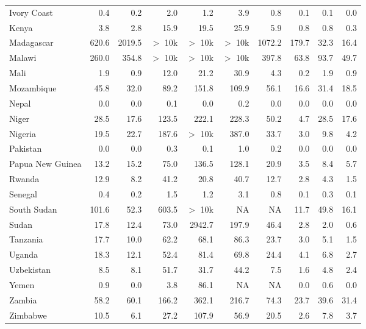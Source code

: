 \begin{table}[b]
{\begin{tabular}[t]{lrrrrrrrrr}
Ivory Coast & 0.4 & 0.2 & 2.0 & 1.2 & 3.9 & 0.8 & 0.1 & 0.1 & 0.0\\
Kenya & 3.8 & 2.8 & 15.9 & 19.5 & 25.9 & 5.9 & 0.8 & 0.8 & 0.3\\
Madagascar & 620.6 & 2019.5 & $>$ 10k & $>$ 10k & $>$ 10k & 1072.2 & 179.7 & 32.3 & 16.4\\
Malawi & 260.0 & 354.8 & $>$ 10k & $>$ 10k & $>$ 10k & 397.8 & 63.8 & 93.7 & 49.7\\
Mali & 1.9 & 0.9 & 12.0 & 21.2 & 30.9 & 4.3 & 0.2 & 1.9 & 0.9\\
Mozambique & 45.8 & 32.0 & 89.2 & 151.8 & 109.9 & 56.1 & 16.6 & 31.4 & 18.5\\
Nepal & 0.0 & 0.0 & 0.1 & 0.0 & 0.2 & 0.0 & 0.0 & 0.0 & 0.0\\
Niger & 28.5 & 17.6 & 123.5 & 222.1 & 228.3 & 50.2 & 4.7 & 28.5 & 17.6\\
Nigeria & 19.5 & 22.7 & 187.6 & $>$ 10k & 387.0 & 33.7 & 3.0 & 9.8 & 4.2\\
Pakistan & 0.0 & 0.0 & 0.3 & 0.1 & 1.0 & 0.2 & 0.0 & 0.0 & 0.0\\
Papua New Guinea & 13.2 & 15.2 & 75.0 & 136.5 & 128.1 & 20.9 & 3.5 & 8.4 & 5.7\\
Rwanda & 12.9 & 8.2 & 41.2 & 20.8 & 40.7 & 12.7 & 2.8 & 4.3 & 1.5\\
Senegal & 0.4 & 0.2 & 1.5 & 1.2 & 3.1 & 0.8 & 0.1 & 0.3 & 0.1\\
South Sudan & 101.6 & 52.3 & 603.5 & $>$ 10k & NA & NA & 11.7 & 49.8 & 16.1\\
Sudan & 17.8 & 12.4 & 73.0 & 2942.7 & 197.9 & 46.4 & 2.8 & 2.0 & 0.6\\
Tanzania & 17.7 & 10.0 & 62.2 & 68.1 & 86.3 & 23.7 & 3.0 & 5.1 & 1.5\\
Uganda & 18.3 & 12.1 & 52.4 & 81.4 & 69.8 & 24.4 & 4.1 & 6.8 & 2.7\\
Uzbekistan & 8.5 & 8.1 & 51.7 & 31.7 & 44.2 & 7.5 & 1.6 & 4.8 & 2.4\\
Yemen & 0.9 & 0.0 & 3.8 & 86.1 & NA & NA & 0.0 & 0.6 & 0.0\\
Zambia & 58.2 & 60.1 & 166.2 & 362.1 & 216.7 & 74.3 & 23.7 & 39.6 & 31.4\\
Zimbabwe & 10.5 & 6.1 & 27.2 & 107.9 & 56.9 & 20.5 & 2.6 & 7.8 & 3.7\\
\bottomrule
\end{tabular}}
\end{table}